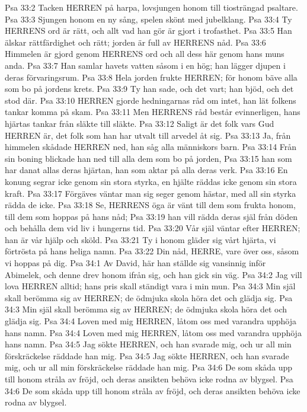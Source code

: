Psa 33:2  Tacken HERREN på harpa, lovsjungen honom till tiosträngad psaltare.
Psa 33:3  Sjungen honom en ny sång, spelen skönt med jubelklang.
Psa 33:4  Ty HERRENS ord är rätt, och allt vad han gör är gjort i trofasthet.
Psa 33:5  Han älskar rättfärdighet och rätt; jorden är full av HERRENS nåd.
Psa 33:6  Himmelen är gjord genom HERRENS ord och all dess här genom hans muns anda.
Psa 33:7  Han samlar havets vatten såsom i en hög; han lägger djupen i deras förvaringsrum.
Psa 33:8  Hela jorden frukte HERREN; för honom bäve alla som bo på jordens krets.
Psa 33:9  Ty han sade, och det vart; han bjöd, och det stod där.
Psa 33:10  HERREN gjorde hedningarnas råd om intet, han lät folkens tankar komma på skam.
Psa 33:11  Men HERRENS råd består evinnerligen, hans hjärtas tankar från släkte till släkte.
Psa 33:12  Saligt är det folk vars Gud HERREN är, det folk som han har utvalt till arvedel åt sig.
Psa 33:13  Ja, från himmelen skådade HERREN ned, han såg alla människors barn.
Psa 33:14  Från sin boning blickade han ned till alla dem som bo på jorden,
Psa 33:15  han som har danat allas deras hjärtan, han som aktar på alla deras verk.
Psa 33:16  En konung segrar icke genom sin stora styrka, en hjälte räddas icke genom sin stora kraft.
Psa 33:17  Förgäves väntar man sig seger genom hästar, med all sin styrka rädda de icke.
Psa 33:18  Se, HERRENS öga är vänt till dem som frukta honom, till dem som hoppas på hans nåd;
Psa 33:19  han vill rädda deras själ från döden och behålla dem vid liv i hungerns tid.
Psa 33:20  Vår själ väntar efter HERREN; han är vår hjälp och sköld.
Psa 33:21  Ty i honom gläder sig vårt hjärta, vi förtrösta på hans heliga namn.
Psa 33:22  Din nåd, HERRE, vare över oss, såsom vi hoppas på dig.
Psa 34:1  Av David, här han ställde sig vansinnig inför Abimelek, och denne drev honom ifrån sig, och han gick sin väg.
Psa 34:2  Jag vill lova HERREN alltid; hans pris skall ständigt vara i min mun.
Psa 34:3  Min själ skall berömma sig av HERREN; de ödmjuka skola höra det och glädja sig.
Psa 34:3  Min själ skall berömma sig av HERREN; de ödmjuka skola höra det och glädja sig.
Psa 34:4  Loven med mig HERREN, låtom oss med varandra upphöja hans namn.
Psa 34:4  Loven med mig HERREN, låtom oss med varandra upphöja hans namn.
Psa 34:5  Jag sökte HERREN, och han svarade mig, och ur all min förskräckelse räddade han mig.
Psa 34:5  Jag sökte HERREN, och han svarade mig, och ur all min förskräckelse räddade han mig.
Psa 34:6  De som skåda upp till honom stråla av fröjd, och deras ansikten behöva icke rodna av blygsel.
Psa 34:6  De som skåda upp till honom stråla av fröjd, och deras ansikten behöva icke rodna av blygsel.
